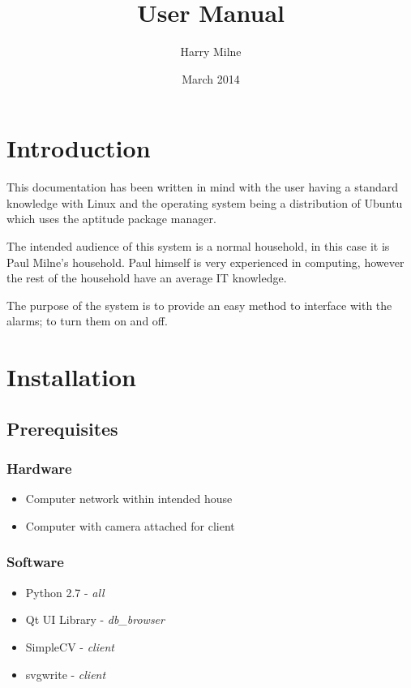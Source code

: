 \documentclass[a4paper]{article}
\title{User Manual}
\author{Harry Milne}
\date{March 2014}
\begin{document}
\maketitle
\tableofcontents
\newpage

\section{Introduction}
    This documentation has been written in mind with the user having a standard knowledge with Linux and the operating system being a
    distribution of Ubuntu which uses the aptitude package manager.

    The intended audience of this system is a normal household, in this case it is Paul Milne's household. Paul himself is very experienced
    in computing, however the rest of the household have an average IT knowledge.

    The purpose of the system is to provide an easy method to interface with the alarms; to turn them on and off. 

\section{Installation}

    \subsection{Prerequisites}

        \subsubsection{Hardware}

            \begin{itemize}
                \item Computer network within intended house
                \item Computer with camera attached for client
            \end{itemize}

        \subsubsection{Software}

            \begin{itemize}
                \item Python 2.7 - \textit{all}
                \item Qt UI Library - \textit{db\_browser}
                \item SimpleCV - \textit{client}
                \item svgwrite - \textit{client}
            \end{itemize}
\end{document}
